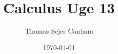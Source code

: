 \documentclass{article}
\title{Calculus Uge 13}
\author{Thomas Sejer Canham}
\date{\today}
\begin{document}
\begin{titlepage}
 \maketitle
 \thispagestyle{empty}
\end{titlepage}
\end{document}
